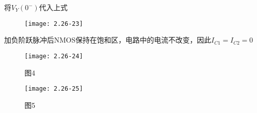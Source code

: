 将$V_Y(0^-)$代入上式

\begin{figure}[H] %
	\begin{minipage}{\linewidth}
		\texttt{[image: 2.26-23]}
	\end{minipage}
\end{figure}

加负阶跃脉冲后NMOS保持在饱和区，电路中的电流不改变，因此$I_{C1}=I_{C2}=0$

		\begin{figure}[H] %
	\begin{minipage}{\linewidth}
		\texttt{[image: 2.26-24]}
	\end{minipage}
	\caption*{图4} %
\end{figure}

\begin{figure}[H] %
	\begin{minipage}{\linewidth}
		\texttt{[image: 2.26-25]}
	\end{minipage}
	\caption*{图5} %
\end{figure}






















\color{black}{
	
}